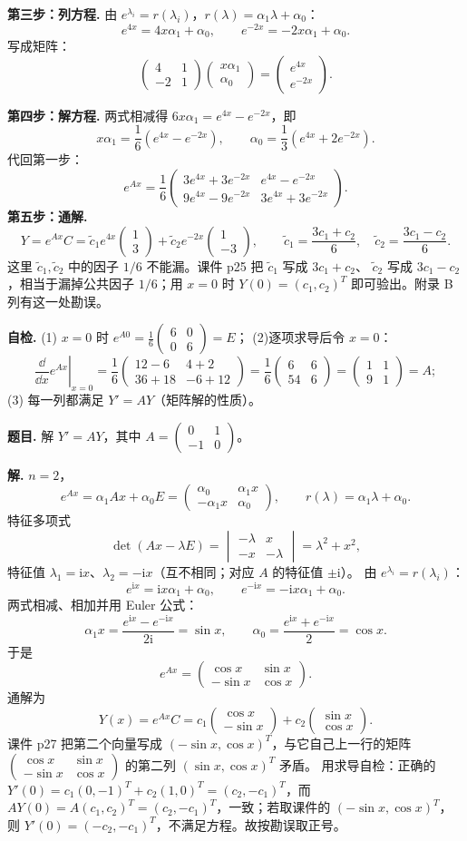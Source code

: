 \documentclass[11pt]{ctexart}
\newcommand{\pmat}[1]{\begin{pmatrix}#1\end{pmatrix}}
\newcommand{\ii}{\mathrm{i}}
\newcommand{\Ax}{Ax}
\begin{document}
\textbf{第三步：列方程.} 由 $e^{\lambda_i}=r(\lambda_i)$，$r(\lambda)=\alpha_1\lambda+\alpha_0$：
\[
e^{4x}=4x\alpha_1+\alpha_0,\qquad
e^{-2x}=-2x\alpha_1+\alpha_0 .
\]
写成矩阵：
\[
\pmat{4&1\\-2&1}\pmat{x\alpha_1\\\alpha_0}=\pmat{e^{4x}\\e^{-2x}}.
\]

\textbf{第四步：解方程.}
两式相减得 $6x\alpha_1=e^{4x}-e^{-2x}$，即
\[
x\alpha_1=\frac16\left(e^{4x}-e^{-2x}\right),\qquad
\alpha_0=\frac13\left(e^{4x}+2e^{-2x}\right).
\]
代回第一步：
\[
e^{Ax}=\frac16\pmat{
3e^{4x}+3e^{-2x} & e^{4x}-e^{-2x}\\
9e^{4x}-9e^{-2x} & 3e^{4x}+3e^{-2x}} .
\]
\textbf{第五步：通解.}
\[
Y=e^{Ax}C
=\tilde c_1e^{4x}\pmat{1\\3}+\tilde c_2e^{-2x}\pmat{1\\-3},
\qquad
\tilde c_1=\frac{3c_1+c_2}{6},\quad
\tilde c_2=\frac{3c_1-c_2}{6}.
\]
这里 $\tilde c_1,\tilde c_2$ 中的因子 $1/6$ 不能漏。课件 p25 把 $\tilde c_1$ 写成 $3c_1+c_2$、
$\tilde c_2$ 写成 $3c_1-c_2$，相当于漏掉公共因子 $1/6$；用 $x=0$ 时 $Y(0)=(c_1,c_2)^T$
即可验出。附录 B 列有这一处勘误。

\textbf{自检.} (1) $x=0$ 时 $e^{A0}=\frac16\pmat{6&0\\0&6}=E$；
(2)逐项求导后令 $x=0$：
\[
\left.\frac{\dd}{\dd x}e^{Ax}\right|_{x=0}
=\frac16\pmat{12-6&4+2\\36+18&-6+12}
=\frac16\pmat{6&6\\54&6}
=\pmat{1&1\\9&1}=A;
\]
(3) 每一列都满足 $Y'=AY$（矩阵解的性质）。


\textbf{题目.} 解 $Y'=AY$，其中 $A=\pmat{0&1\\-1&0}$。

\textbf{解.} $n=2$，
\[
e^{Ax}=\alpha_1\Ax+\alpha_0E
=\pmat{\alpha_0&\alpha_1x\\-\alpha_1x&\alpha_0},\qquad
r(\lambda)=\alpha_1\lambda+\alpha_0 .
\]
特征多项式
\[
\det(\Ax-\lambda E)=\begin{vmatrix}-\lambda&x\\-x&-\lambda\end{vmatrix}=\lambda^2+x^2,
\]
特征值 $\lambda_1=\ii x$、$\lambda_2=-\ii x$（互不相同；对应 $A$ 的特征值 $\pm\ii$）。
由 $e^{\lambda_i}=r(\lambda_i)$：
\[
e^{\ii x}=\ii x\alpha_1+\alpha_0,\qquad
e^{-\ii x}=-\ii x\alpha_1+\alpha_0 .
\]
两式相减、相加并用 Euler 公式：
\[
\alpha_1x=\frac{e^{\ii x}-e^{-\ii x}}{2\ii}=\sin x,\qquad
\alpha_0=\frac{e^{\ii x}+e^{-\ii x}}{2}=\cos x .
\]
于是
\[
e^{Ax}=\pmat{\cos x&\sin x\\-\sin x&\cos x}.
\]
通解为
\[
Y(x)=e^{Ax}C
=c_1\pmat{\cos x\\-\sin x}+c_2\pmat{\sin x\\\cos x}.
\]
课件 p27 把第二个向量写成 $(-\sin x,\cos x)^T$，与它自己上一行的矩阵
$\pmat{\cos x&\sin x\\-\sin x&\cos x}$ 的第二列 $( \sin x,\cos x)^T$ 矛盾。
用求导自检：正确的 $Y'(0)=c_1(0,-1)^T+c_2(1,0)^T=(c_2,-c_1)^T$，而
$AY(0)=A(c_1,c_2)^T=(c_2,-c_1)^T$，一致；若取课件的 $(-\sin x,\cos x)^T$，则
$Y'(0)=(-c_2,-c_1)^T$，不满足方程。故按勘误取正号。
\end{document}
